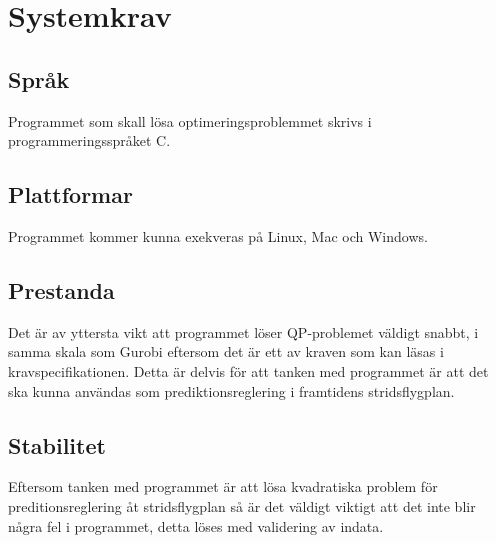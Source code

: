 \section{Systemkrav}

\subsection{Språk}
Programmet som skall lösa optimeringsproblemmet skrivs i programmeringsspråket C.

\subsection{Plattformar}
Programmet kommer kunna exekveras på Linux, Mac och Windows.

\subsection{Prestanda}
Det är av yttersta vikt att programmet löser QP-problemet väldigt snabbt, i samma skala som Gurobi eftersom det är ett av kraven som kan läsas i kravspecifikationen. Detta är delvis för att tanken med programmet är att det ska kunna användas som prediktionsreglering i framtidens stridsflygplan.

\subsection{Stabilitet}
Eftersom tanken med programmet är att lösa kvadratiska problem för preditionsreglering åt stridsflygplan så är det väldigt viktigt att det inte blir några fel i programmet, detta löses med validering av indata.